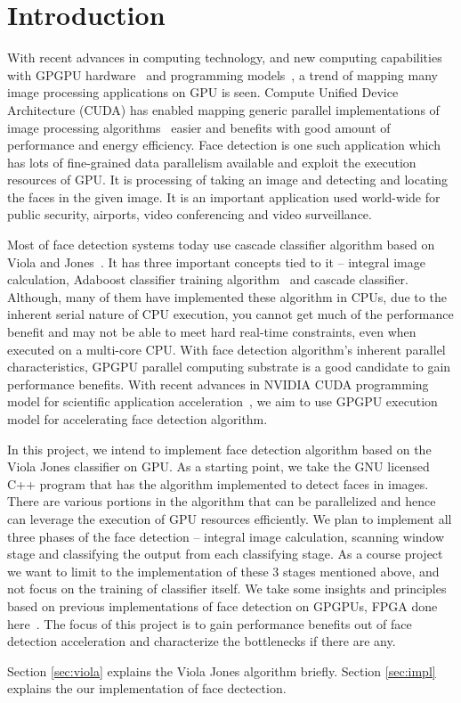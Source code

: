\section{Introduction}\label{sec:intro}

With recent advances in computing technology, and new computing capabilities
with GPGPU hardware~\cite{owens2008gpu} and programming models~\cite{nvidia2007compute}, 
a trend of mapping many image processing applications on GPU is seen. 
Compute Unified Device Architecture (CUDA) has enabled mapping generic parallel
implementations of image processing algorithms~\cite{yang2008parallel} easier and benefits with good amount of 
performance and energy efficiency. 
Face detection is one such application which has lots of fine-grained
data parallelism available and exploit the execution resources of GPU.
It is processing of taking an image and detecting and locating the faces 
in the given image. It is an important application used world-wide for
public security, airports, video conferencing and video surveillance. 

Most of face detection systems today use cascade classifier algorithm 
based on Viola and Jones~\cite{viola2001rapid}. It has three important 
concepts tied to it -- integral image calculation, Adaboost classifier training
algorithm~\cite{freund1999short} and cascade classifier.  
Although, many of them have implemented these algorithm in CPUs, due to 
the inherent serial nature of CPU execution, you cannot get much of the
performance benefit and may not be able to meet hard real-time constraints,
even when executed on a multi-core CPU. 
With face detection algorithm's inherent parallel characteristics, GPGPU 
parallel computing substrate is a good candidate to gain performance benefits. 
With recent advances in NVIDIA CUDA programming model for scientific application 
acceleration~\cite{buck2007gpu}, we aim to use GPGPU execution model for accelerating face detection algorithm.

In this project, we intend to implement face detection algorithm 
based on the Viola Jones classifier on GPU. 
As a starting point, we take the GNU licensed C++ program that has the 
algorithm implemented to detect faces in images. 
There are various portions in the algorithm that 
can be parallelized and hence can leverage the execution of GPU resources efficiently. 
We plan to implement all three phases of the face detection -- integral image calculation,
scanning window stage and classifying the output from each classifying stage. 
As a course project we want to limit to the implementation of these 3 stages mentioned above, 
and not focus on the training of classifier itself. We take some insights and principles
based on previous implementations of face detection on GPGPUs, FPGA done here~\cite{kong2010gpu, sun2013acceleration, cho2009fpga}.
The focus of this project is
to gain performance benefits out of face detection acceleration and characterize
the bottlenecks if there are any. 

Section \ref{sec:viola} explains the Viola Jones algorithm briefly. 
Section \ref{sec:impl} explains the our implementation of face dectection.


